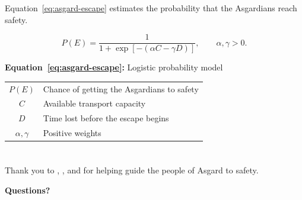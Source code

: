 \begin{FormulaSlide}[title={A Narrowing Window to Escape}, subtitle={A hypothetical account of the flight from Asgard}, note={More transport and less delay improve the chance of escape in this imagined model.}]
    Equation~\eqref{eq:asgard-escape} estimates the probability that the Asgardians reach safety.
    {\centering
    {\Large
    \begin{equation}
        P(E)=\frac{1}{1+\exp[-(\alpha C-\gamma D)]},\qquad \alpha,\gamma>0.
        \label{eq:asgard-escape}
    \end{equation}}
    {\footnotesize\textbf{Equation~\ref{eq:asgard-escape}:} Logistic probability model\par}
    \bigskip
    {\footnotesize
    \begin{tabular}{@{}cl@{}}
        $P(E)$ & Chance of getting the Asgardians to safety\\
        $C$ & Available transport capacity\\
        $D$ & Time lost before the escape begins\\
        $\alpha,\gamma$ & Positive weights\\
    \end{tabular}}
    \par}
\end{FormulaSlide}

\section{\refname}
\ReferencesSlide[
    subtitle = {Records of Asgard's fall and the survivors' flight},
    note = {Point to the sources listed here for the chronicle.}
]

\begin{AcknowledgmentsSlide}[
    subtitle = {Questions and discussion},
    note = {Thank Heimdall, Valkyrie, and the audience, and open the floor for questions.}
]
    Thank you to , , and  for helping guide the people of Asgard to safety.

    \bigskip
    \textbf{Questions?}
\end{AcknowledgmentsSlide}
